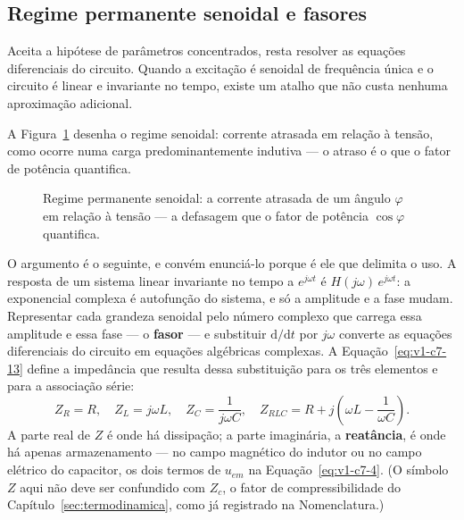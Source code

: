 \documentclass[12pt,a4paper]{article}
\numberwithin{equation}{section}
\numberwithin{table}{section}
\numberwithin{figure}{section}
\begin{document}
\subsection{Regime permanente senoidal e fasores}\label{sub:v1-c7-fasores}

Aceita a hipótese de parâmetros concentrados, resta resolver as equações
diferenciais do circuito. Quando a excitação é senoidal de frequência única e o
circuito é linear e invariante no tempo, existe um atalho que não custa
nenhuma aproximação adicional.

A Figura~\ref{fig:v1-c7-2} desenha o regime senoidal: corrente atrasada em
relação à tensão, como ocorre numa carga predominantemente indutiva --- o
atraso é o que o fator de potência quantifica.

\begin{figure}[H]
\centering
{}
\caption[Tensão e corrente defasadas numa carga indutiva.]{Regime
permanente senoidal: a corrente atrasada de um ângulo $\varphi$ em relação
à tensão --- a defasagem que o fator de potência $\cos\varphi$ quantifica.}
\label{fig:v1-c7-2}
\end{figure}


O argumento é o seguinte, e convém enunciá-lo porque é ele que delimita o uso.
A resposta de um sistema linear invariante no tempo a $e^{j\omega t}$ é
$H(j\omega)\,e^{j\omega t}$: a exponencial complexa é autofunção do sistema, e
só a amplitude e a fase mudam. Representar cada grandeza senoidal pelo número
complexo que carrega essa amplitude e essa fase --- o \textbf{fasor} --- e
substituir $\mathrm{d}/\mathrm{d}t$ por $j\omega$ converte as equações
diferenciais do circuito em equações algébricas complexas. A
Equação~\eqref{eq:v1-c7-13} define a impedância que resulta dessa substituição
para os três elementos e para a associação série:
\begin{equation}\label{eq:v1-c7-13}
Z_R = R,
\quad
Z_L = j\omega L,
\quad
Z_C = \frac{1}{j\omega C},
\quad
Z_{RLC} = R + j\left(\omega L - \frac{1}{\omega C}\right).
\end{equation}
A parte real de $Z$ é onde há dissipação; a parte imaginária, a
\textbf{reatância}, é onde há apenas armazenamento --- no campo magnético do
indutor ou no campo elétrico do capacitor, os dois termos de $u_{em}$ na
Equação~\eqref{eq:v1-c7-4}. (O símbolo $Z$ aqui não deve ser confundido com
$Z_c$, o fator de compressibilidade do Capítulo~\ref{sec:termodinamica}, como
já registrado na Nomenclatura.)
\end{document}

